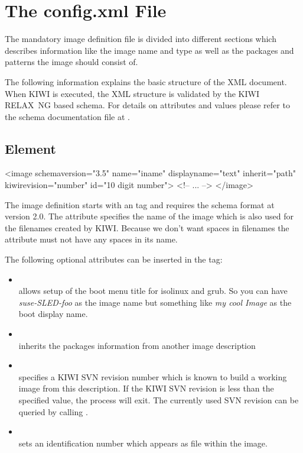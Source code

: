 \section{The config.xml File}
The mandatory image definition file is divided into different sections
which describes information like the image name and type as well as
the packages and patterns the image should consist of.

The following information explains the basic structure of the XML document. When KIWI
is executed, the XML structure is validated by the KIWI RELAX~NG based schema.
For details on attributes and values please refer to the schema
documentation file at .

\subsection{ Element}
\begin{xml}
<image schemaversion="3.5" name="iname"
 displayname="text"
 inherit="path" kiwirevision="number"
 id="10 digit number">
  <!-- ... -->
</image>
\end{xml}

The image definition starts with an  tag and requires the
schema format at version 2.0. The attribute  specifies the
name of the image which is also used for the filenames created
by KIWI. Because we don't want spaces in filenames the 
attribute must not have any spaces in its name.

The following optional attributes can be inserted in the  tag:
\begin{itemize}
\item {}\\
      allows setup of the boot
      menu title for isolinux and grub. So you can have
      \textit{suse-SLED-foo} as the image name but something like
      \textit{my cool Image} as the boot display name.

\item {} \\
      inherits the packages information from another image description

\item {} \\
      specifies a KIWI SVN revision number which is known to build
      a working image from this description. If the KIWI SVN
      revision is less than the specified value, the
      process will exit. The currently used SVN revision can
      be queried by calling  .

\item {}\\
      sets an identification
      number which appears as file  within the
      image.
\end{itemize}

